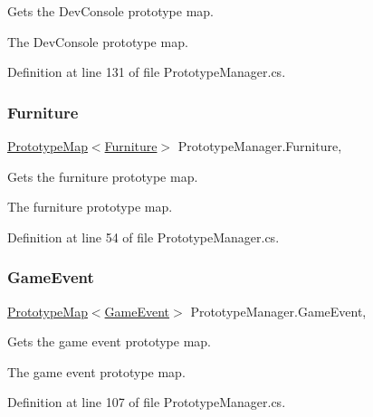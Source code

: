 Gets the Dev\+Console prototype map. 

The Dev\+Console prototype map.

Definition at line 131 of file Prototype\+Manager.\+cs.

\mbox{\label{class_prototype_manager_ab60d7059dfa3996ba62c501f293d3afe}} 
\subsubsection{\texorpdfstring{Furniture}{Furniture}}
{\footnotesize\ttfamily \hyperlink{class_prototype_map}{Prototype\+Map}$<$\hyperlink{class_furniture}{Furniture}$>$ Prototype\+Manager.\+Furniture\hspace{0.3cm}{\ttfamily [static]}, {\ttfamily [get]}}



Gets the furniture prototype map. 

The furniture prototype map.

Definition at line 54 of file Prototype\+Manager.\+cs.

\mbox{\label{class_prototype_manager_a2b3ce5adb222fc3f513a018dd708a0d6}} 
\subsubsection{\texorpdfstring{Game\+Event}{GameEvent}}
{\footnotesize\ttfamily \hyperlink{class_prototype_map}{Prototype\+Map}$<$\hyperlink{class_game_event}{Game\+Event}$>$ Prototype\+Manager.\+Game\+Event\hspace{0.3cm}{\ttfamily [static]}, {\ttfamily [get]}}



Gets the game event prototype map. 

The game event prototype map.

Definition at line 107 of file Prototype\+Manager.\+cs.

\mbox{\label{class_prototype_manager_abc0a929a1a2b353bdbd750118809bff2}} 
